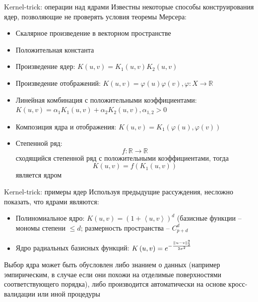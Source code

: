 \begin{frame}{Kernel-trick: операции над ядрами}
	Известны некоторые способы конструирования ядер, позволяющие не проверять условия теоремы Мерсера:
	\begin{itemize}
		\item Скалярное произведение в векторном пространстве
		\item Положительная константа
		\item Произведение ядер: $K\left(u,v\right)=K_1\left(u,v\right)K_2\left(u, v\right)$
		\item Произведение отображений: $K\left(u, v\right)=\varphi\left(u\right)\varphi\left(v\right), \varphi:X\rightarrow \mathbb{R}$
		\item Линейная комбинация с положительными коэффициентами: $K\left(u, v\right)=\alpha_1K_1\left(u,v\right)+\alpha_2K_2\left(u, v\right), \alpha_{1,2}>0$
		\item Композиция ядра и отображения: $K\left(u, v\right)=K_1\left(\varphi\left(u\right),\varphi\left(v\right)\right)$
		\item Степенной ряд: 
			$$f: \mathbb{R}\rightarrow\mathbb{R}$$
			сходящийся степенной ряд с положительными коэффициентами, тогда
			$$K\left(u, v\right)=f\left(K_1\left(u,v\right)\right)$$
			является ядром
	\end{itemize}
\end{frame}

\begin{frame}{Kernel-trick: примеры ядер}
	Используя предыдущие рассуждения, несложно показать, что ядрами являются:
	\begin{itemize}
		\item Полиномиальное ядро: $K\left(u,v\right)=\left(1+\left\langle u, v\right\rangle\right)^d$ (базисные функции -- мономы степени $\leq d$; размерность пространства -- $C_{p+d}^d$
		\item Ядро радиальных базисных функций: $K\left(u, v\right)=e^{-\frac{\norm{u-v}^2_2}{2\sigma^2}}$
	\end{itemize}

    Выбор ядра может быть обусловлен либо знанием о данных (например эмпирическим, в случае если они похожи на отделимые поверхностями соответствующего порядка),
    либо производится автоматически на основе кросс-валидации или иной процедуры
\end{frame}


